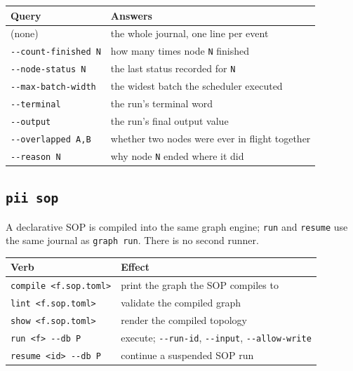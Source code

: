 \begin{center}
\begin{tabular}{@{}>{\raggedright\arraybackslash}p{}>{\raggedright\arraybackslash}p{}@{}}
  \toprule
  \textbf{Query} & \textbf{Answers} \\
  \midrule
  (none) & the whole journal, one line per event \\
  \texttt{-{}-count-finished N} & how many times node \texttt{N} finished \\
  \texttt{-{}-node-status N} & the last status recorded for \texttt{N} \\
  \texttt{-{}-max-batch-width} & the widest batch the scheduler executed \\
  \texttt{-{}-terminal} & the run's terminal word \\
  \texttt{-{}-output} & the run's final output value \\
  \texttt{-{}-overlapped A,B} & whether two nodes were ever in flight together \\
  \texttt{-{}-reason N} & why node \texttt{N} ended where it did \\
  \bottomrule
\end{tabular}
\end{center}

\subsection*{\texttt{pii sop}}

A declarative SOP is compiled into the same graph engine; \texttt{run} and \texttt{resume} use
the same journal as \texttt{graph run}. There is no second runner.

\begin{center}
\begin{tabular}{@{}>{\raggedright\arraybackslash}p{}>{\raggedright\arraybackslash}p{}@{}}
  \toprule
  \textbf{Verb} & \textbf{Effect} \\
  \midrule
  \texttt{compile <f.sop.toml>} & print the graph the SOP compiles to \\
  \texttt{lint <f.sop.toml>} & validate the compiled graph \\
  \texttt{show <f.sop.toml>} & render the compiled topology \\
  \texttt{run <f> -{}-db P} & execute; \texttt{-{}-run-id}, \texttt{-{}-input},
    \texttt{-{}-allow-write} \\
  \texttt{resume <id> -{}-db P} & continue a suspended SOP run \\
  \bottomrule
\end{tabular}
\end{center}

